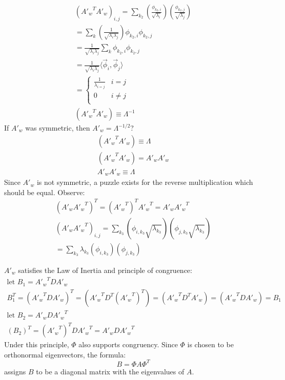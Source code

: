 \documentclass[11pt]{article}
\begin{document}
\begin{eqnarray}
	({A'_w}^T A'_w) _{i,j} = \sum_{k_2} (\frac{\phi_{{k_2},i}}{ \sqrt{\lambda_i}})(\frac{\phi_{{k_2},j}}{ \sqrt{\lambda_j}})  \\
	= \sum _k (\frac{1}{\sqrt{\lambda_i \lambda_j}})\phi_{{k_2},i} \phi_{{k_2},j} \\
	=\frac{1}{\sqrt{\lambda_i \lambda_j}} \sum_k \phi_{{k_2},i} \phi_{{k_2},j} \\
	= \frac{1}{\sqrt{\lambda_i \lambda_j}} \langle \vec{\phi}_i, \vec{\phi}_j \rangle \\
	= \left\{
	\begin{array}{ll}
	\frac{1}{\lambda_{i=j}} &  i = j \\
	0 &  i \neq j \\
	\end{array}
	\right. \\
	({A'_w}^T A'_w) \equiv \Lambda ^{-1} 
\end{eqnarray}
If $A'_w$ was symmetric, then $A'_w = \Lambda ^{-1/2}$? 
\begin{eqnarray}
	({A'_w}^T A'_w) \equiv \Lambda \\
	({A'_w}^T A'_w) = A'_w A'_w \\
	{A'_w A'_w} \equiv \Lambda
\end{eqnarray}
Since $A'_w$ is not symmetric, 
a puzzle exists for the reverse multiplication which should be equal.  Observe:
\begin{eqnarray}
(A'_w {A'_w}^T )^T =  ({A'_w}^T)^T {A'_w}^T = A'_w {A'_w}^T \label{symmetricAwAwT} \\
(A'_w {A'_w}^T ) _{i,j} = \sum_{k_3} (\phi_{i,{k_3}} \sqrt{\lambda_{k_3}})(\phi_{j,{k_3}} \sqrt{\lambda_{k_3}})   \\
 = \sum_{k_3} \lambda_{k_3} (\phi_{i,{k_3}})(\phi_{j,{k_3}} )   
\end{eqnarray}



$A'_w$ satisfies the Law of Inertia and principle of congruence:
\begin{eqnarray}
	\textrm{let }B_1 = {A'_w }^T D A'_w  \label{premiseOfCongruent}\\
	B_1^T = ({A'_w} ^T D A'_w)^T = ({A'_w} ^T D^T ({A'_w} ^T)^T ) = ({A'_w} ^T D^T A'_w  ) = ({A'_w} ^T D A'_w  )  = B_1 \label{congruentPrinciple} \\
	\textrm{let }B_2 =   A'_w D {A'_w }^T  \label{premiseOfCongruentReversed}\\
	(B_2)^T =  ({A'_w }^T)^T D {A'_w}^T = A'_w D {A'_w}^T  \label{congruentPrincipleInReverse} 
\end{eqnarray}
Under this principle, $\Phi$ also supports congruency.  Since  $\Phi$ is chosen to be orthonormal eigenvectors, the formula:
\[
B = \Phi A \Phi^T
\]
assigns $B$ to be a diagonal matrix with the eigenvalues of $A$.
\end{document}
